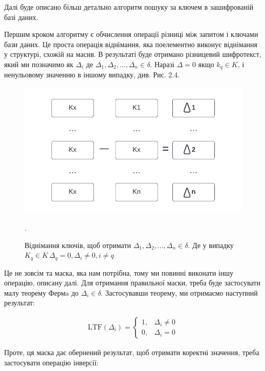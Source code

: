 \begin{itemize}
{    Далі буде описано більш детально алгоритм пошуку за ключем в зашифрованій базі даних.
    
    Першим кроком алгоритму є обчислення операції різниці між запитом і ключами бази даних. Це
    проста операція віднімання, яка поелементно виконує віднімання у структурі, схожій на масив. В
    результаті буде отримано різницевий шифротекст, який ми позначимо як \(\Delta_i\) де
\(\Delta_1,\Delta_2,...,\Delta_n \in \delta\). Наразі 
    \(\Delta = 0\) якщо \(k_q \in K\), і ненульовому значенню в іншому випадку, див. Рис. 2.4.

\begin{figure}[!ht]
    \centering
    \label{fig:key-subsruction}
    \includegraphics[scale=1.25]{static/key-substruction.png}
    \caption{Віднімання ключів, щоб отримати \(\Delta_1,\Delta_2,...,\Delta_n \in \delta\).
    Де у випадку \(K_q \in K\, \Delta_q = 0, \Delta_i \neq 0, i \neq q\)}.
\end{figure}


Це не зовсім та маска, яка нам потрібна, тому ми повинні виконати іншу операцію, описану далі.
Для отримання правильної маски, треба буде застосувати малу теорему Фермa  \cite{Fermat} до
\(\Delta_i \in \delta\). Застосувавши теорему, ми отримаємо наступний результат:

\begin{align*}
\text{LTF}(\Delta_i) =
\begin{cases} 
    1, & \Delta_i \neq 0 \\
    0, & \Delta_i = 0
\end{cases}
\end{align*}

Проте, ця маска дає обернений результат, щоб отримати коректні значення, треба застосувати
операцію інверсії:

}
\end{itemize}
